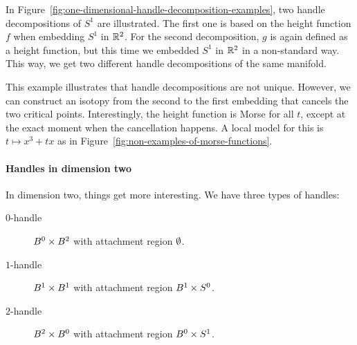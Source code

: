\begin{eg}
    In Figure~\ref{fig:one-dimensional-handle-decomposition-examples}, two handle decompositions of $S^{1}$ are illustrated.
    The first one is based on the height function $f$ when embedding $S^{1}$ in $\mathbb{R}^2$.
    For the second decomposition, $g$ is again defined as a height function, but this time we embedded $S^{1}$ in $ \mathbb{R}^2$ in a non-standard way.
    This way, we get two different handle decompositions of the same manifold.
\end{eg}
\begin{figure}[H]
    \centering
\end{figure}
This example illustrates that handle decompositions are not unique.
However, we can construct an isotopy from the second to the first embedding that cancels the two critical points.
Interestingly, the height function is Morse for all $t$, except at the exact moment when the cancellation happens.
A local model for this is $t\mapsto x^3 + tx$ as in Figure~\ref{fig:non-examples-of-morse-functions}.
\begin{figure}[H]
    \centering
\end{figure}


\paragraph{Handles in dimension two}
In dimension two, things get more interesting.
We have three types of handles:

\begin{description}
    \item[$0$-handle] $B^{0} \times B^{2}$ with attachment region $\emptyset$. \hfill {}
    \item[$1$-handle] $B^{1} \times B^{1}$ with attachment region $B^{1} \times S^{0}$. \hfill{}
    \item[$2$-handle] $B^{2} \times B^{0}$ with attachment region $B^{0} \times S^1$. \hfill{}
\end{description}


